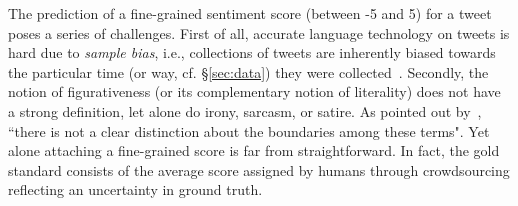 \documentclass[11pt,letterpaper]{article}
\begin{document}
The prediction of a fine-grained sentiment score (between -5 and 5) for a tweet poses a series of challenges. 
First of all, accurate language technology on tweets is hard due to %
\textit{sample bias}, i.e., collections of tweets are inherently biased towards the particular time (or way, cf. \S \ref{sec:data}) they were collected~\cite{Eisenstein:2013,Hovy:ea:2014:LREC}. Secondly, the notion of figurativeness (or its complementary notion of literality) does not have a strong definition, let alone do irony, sarcasm, or satire. As pointed out by~, ``there is not a clear distinction about the boundaries among these terms".  Yet alone attaching a fine-grained score is far from straightforward. In fact, the gold standard consists of the average score assigned by humans through crowdsourcing reflecting an uncertainty in ground truth. %




\end{document}
